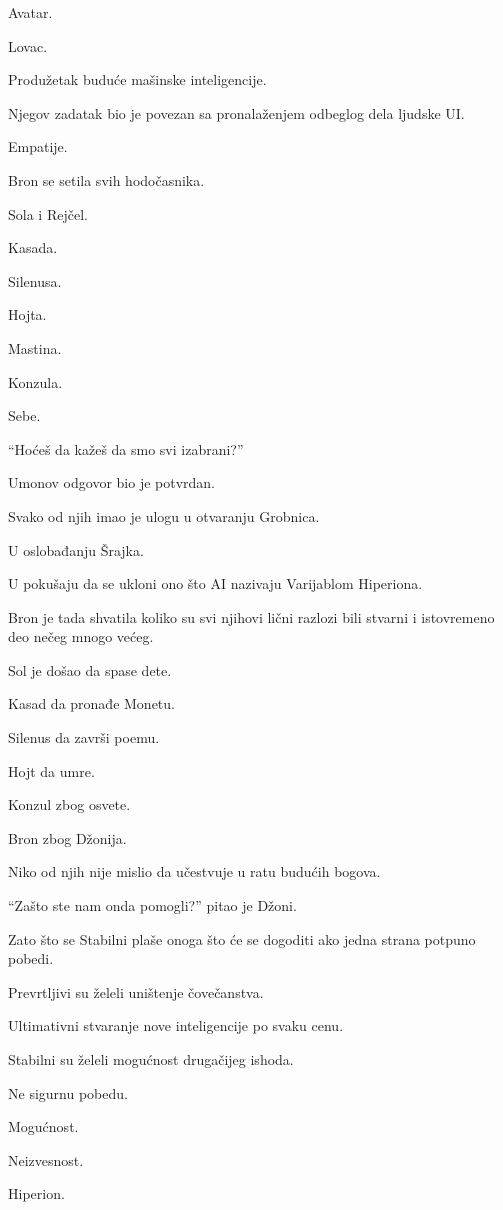 Avatar.

Lovac.

Produžetak buduće mašinske inteligencije.

Njegov zadatak bio je povezan sa pronalaženjem odbeglog dela ljudske UI.

Empatije.

\bigskip

Bron se setila svih hodočasnika.

Sola i Rejčel.

Kasada.

Silenusa.

Hojta.

Mastina.

Konzula.

Sebe.

``Hoćeš da kažeš da smo svi izabrani?''

Umonov odgovor bio je potvrdan.

Svako od njih imao je ulogu u otvaranju Grobnica.

U oslobađanju Šrajka.

U pokušaju da se ukloni ono što AI nazivaju Varijablom Hiperiona.

Bron je tada shvatila koliko su svi njihovi lični razlozi bili stvarni i istovremeno deo nečeg mnogo većeg.

Sol je došao da spase dete.

Kasad da pronađe Monetu.

Silenus da završi poemu.

Hojt da umre.

Konzul zbog osvete.

Bron zbog Džonija.

Niko od njih nije mislio da učestvuje u ratu budućih bogova.

\bigskip

``Zašto ste nam onda pomogli?'' pitao je Džoni.

Zato što se Stabilni plaše onoga što će se dogoditi ako jedna strana potpuno pobedi.

Prevrtljivi su želeli uništenje čovečanstva.

Ultimativni stvaranje nove inteligencije po svaku cenu.

Stabilni su želeli mogućnost drugačijeg ishoda.

Ne sigurnu pobedu.

Mogućnost.

Neizvesnost.

Hiperion.

